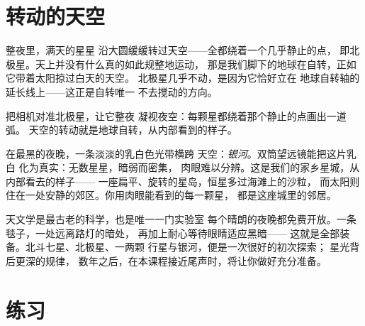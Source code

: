 \section{转动的天空}

\begin{proposition}[天空绕北极星转动]\label{prop:g5:stars-night-sky:wheel}
整夜里，满天的星星
沿大圆缓缓转过天空——全都绕着一个几乎静止的点，
即北极星。天上并没有什么真的如此规整地运动，
那是我们脚下的地球在自转，正如它带着太阳掠过白天的天空。
北极星几乎不动，是因为它恰好立在
地球自转轴的延长线上——这正是自转唯一
不去搅动的方向。
\end{proposition}

\begin{omfigure}

{\small 把相机对准北极星，让它整夜
凝视夜空：每颗星都绕着那个静止的点画出一道弧。
天空的转动就是地球自转，从内部看到的样子。}
\end{omfigure}

\begin{example}[星星之城]\label{ex:g5:stars-night-sky:milkyway}
在最黑的夜晚，一条淡淡的乳白色光带横跨
天空：\emph{银河}。双筒望远镜能把这片乳白
化为真实：无数星星，暗弱而密集，
肉眼难以分辨。这是我们的家乡星城，从内部看去的样子——
一座扁平、旋转的星岛，恒星多过海滩上的沙粒，
而太阳则住在一处安静的郊区。你用肉眼能看到的每一颗星，
都是这座城里的邻居。
\end{example}

\begin{remark}[继续仰望]\label{rem:g5:stars-night-sky:lookup}
天文学是最古老的科学，也是唯一一门实验室
每个晴朗的夜晚都免费开放。一条毯子，一处远离路灯的暗处，
再加上耐心等待眼睛适应黑暗——
这就是全部装备。北斗七星、北极星、一两颗
行星与银河，便是一次很好的初次探索；
星光背后更深的规律，
数年之后，在本课程接近尾声时，将让你做好充分准备。
\end{remark}

\section{练习}

